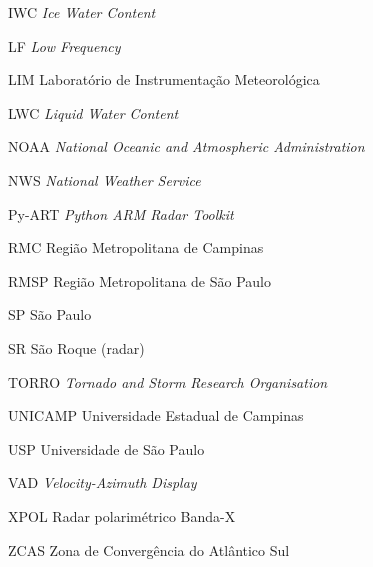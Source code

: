 \begin{siglas}
  \item[IWC] \textit{Ice Water Content}
  \item[LF] \textit{Low Frequency}
  \item[LIM] Laboratório de Instrumentação Meteorológica
  \item[LWC] \textit{Liquid Water Content}
  \item[NOAA] \textit{National Oceanic and Atmospheric Administration}
  \item[NWS] \textit{National Weather Service}
  \item[Py-ART] \textit{Python ARM Radar Toolkit}
  \item[RMC] Região Metropolitana de Campinas
  \item[RMSP] Região Metropolitana de São Paulo
  \item[SP] São Paulo
  \item[SR] São Roque (radar)
  \item[TORRO] \textit{Tornado and Storm Research Organisation}
  \item[UNICAMP] Universidade Estadual de Campinas
  \item[USP] Universidade de São Paulo
  \item[VAD] \textit{Velocity-Azimuth Display}
  \item[XPOL] Radar polarimétrico Banda-X
  \item[ZCAS] Zona de Convergência do Atlântico Sul
\end{siglas}
